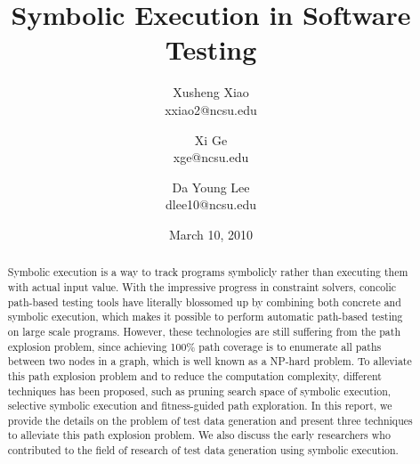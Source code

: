 \documentclass[times, 10pt,onecolumn]{article}
\title{Symbolic Execution in Software Testing}
\author{
Xusheng Xiao\\
\small{xxiao2@ncsu.edu}\\
\and
Xi Ge\\
\small{xge@ncsu.edu}\\
\and
Da Young Lee\\
\small{dlee10@ncsu.edu}
}
\date{March 10, 2010}
\begin{document}
\maketitle
\thispagestyle{empty}
\pagestyle{empty}

\begin{abstract}
Symbolic execution is a way to track programs symbolicly rather than executing them with actual input value. With the impressive progress in constraint solvers, concolic path-based testing tools have literally blossomed up by combining both concrete and symbolic execution, which makes it possible to perform automatic path-based testing on large scale programs. However, these technologies are still suffering from the path explosion problem, since achieving 100\% path coverage is to enumerate all paths between two nodes in a graph, which is well known as a NP-hard problem. To alleviate this path explosion problem and to reduce the computation complexity, different techniques has been proposed, such as pruning search space of symbolic execution, selective symbolic execution and fitness-guided path exploration. In this report, we provide the details on the problem of test data generation and present three techniques to alleviate this path explosion problem. We also discuss the early researchers who contributed to the field of research of test data generation using symbolic execution. \end{abstract}













\end{document}
